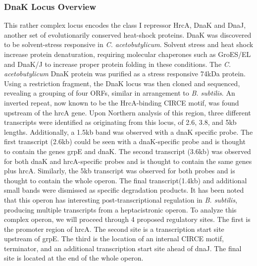 \subsubsection{DnaK Locus Overview}
This rather complex locus encodes the class I repressor HrcA, DnaK and DnaJ, another set of evolutionarily conserved heat-shock proteins. DnaK was discovered to be solvent-stress responsive in \textit{C. acetobutylicum}\cite{74,75}. Solvent stress and heat shock increase protein denaturation, requiring molecular chaperones such as GroES/EL and DnaK/J to increase proper protein folding in these conditions. The \textit{C. acetobutylicum} DnaK protein was purified as a stress responsive 74kDa protein\cite{75}. Using a restriction fragment, the DnaK locus was then cloned and sequenced\cite{80}, revealing a grouping of four ORFs, similar in arrangement to \textit{B. subtilis}\cite{77}. An inverted repeat, now known to be the HrcA-binding CIRCE motif, was found upstream of the hrcA gene\cite{80}. Upon Northern analysis of this region, three different transcripts were identified as originating from this locus, of 2.6, 3.8, and 5kb lengths. Additionally, a 1.5kb band was observed with a dnaK specific probe\cite{80}. The first transcript (2.6kb) could be seen with a dnaK-specific probe and is thought to contain the genes grpE and dnaK. The second transcript (3.6kb) was observed for both dnaK and hrcA-specific probes and is thought to contain the same genes plus hrcA. Similarly, the 5kb transcript was observed for both probes and is thought to contain the whole operon. The final transcript(1.4kb) and additional small bands were dismissed as specific degradation products. It has been noted that this operon has interesting post-transcriptional regulation in \textit{B. subtilis}, producing multiple transcripts from a heptacistronic operon\cite{81}. To analyze this complex operon, we will proceed through 4 proposed regulatory sites. The first is the promoter region of hrcA. The second site is a transcription start site upstream of grpE. The third is the location of an internal CIRCE motif, terminator, and an additional transcription start site ahead of dnaJ. The final site is located at the end of the whole operon.

